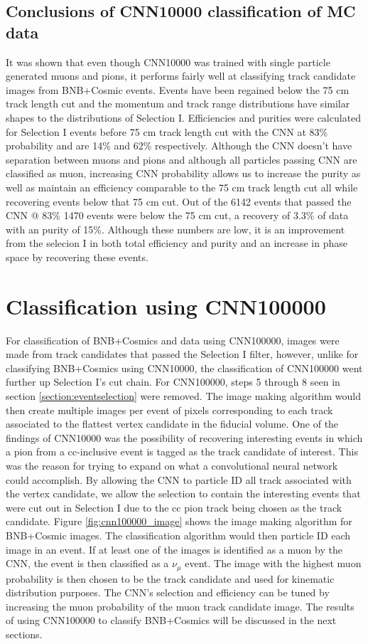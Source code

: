 \subsection{Conclusions of CNN10000 classification of MC data}

It was shown that even though CNN10000 was trained with single particle generated muons and pions, it performs fairly well at classifying track candidate images from BNB+Cosmic events. Events have been regained below the 75 cm track length cut and the momentum and track range distributions have similar shapes to the distributions of Selection I. Efficiencies and purities were calculated for Selection I events before 75 cm track length cut  with the CNN at 83\% probability and are 14\% and 62\% respectively. Although the CNN doesn't have separation between muons and pions and although all particles passing CNN are classified as muon, increasing CNN probability allows us to increase the purity as well as maintain an efficiency comparable to the 75 cm track length cut all while recovering events below that 75 cm cut. Out of the 6142 events that passed the CNN @ 83\% 1470 events were below the 75 cm cut, a recovery of 3.3\% of data with an purity of 15\%. Although these numbers are low, it is an improvement from the selecion I in both total efficiency and purity and an increase in phase space by recovering these events. 

\section{Classification using CNN100000}
For classification of BNB+Cosmics and data using CNN100000, images were made from track candidates that passed the Selection I filter, however, unlike for classifying BNB+Cosmics using CNN10000, the classification of CNN100000 went further up Selection I's cut chain. For CNN100000, steps 5 through 8 seen in section \ref{section:eventselection} were removed. The image making algorithm would then create multiple images per event of pixels corresponding to each track associated to the flattest vertex candidate in the fiducial volume. One of the findings of CNN10000 was the possibility of recovering interesting events in which a pion from a cc-inclusive event is tagged as the track candidate of interest. This was the reason for trying to expand on what a convolutional neural network could accomplish. By allowing the CNN to particle ID all track associated with the vertex candidate, we allow the selection to contain the interesting events that were cut out in Selection I due to the cc pion track being chosen as the track candidate. Figure \ref{fig:cnn100000_image} shows the image making algorithm for BNB+Cosmic images. The classification algorithm would then particle ID each image in an event. If at least one of the images is identified as a muon by the CNN, the event is then classified as a $\nu_{\mu}$ event. The image with the highest muon probability is then chosen to be the track candidate and used for kinematic distribution purposes. The CNN's selection and efficiency can be tuned by increasing the muon probability of the muon track candidate image. The results of using CNN100000 to classify BNB+Cosmics will be discussed in the next sections. 

